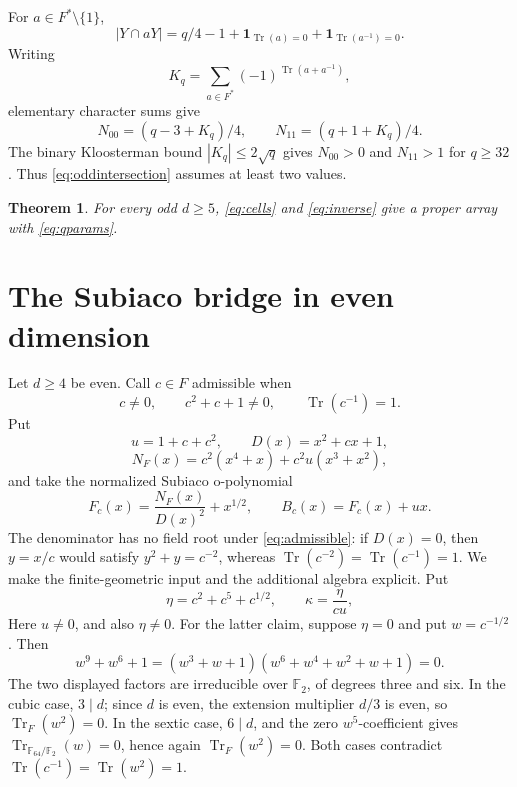\documentclass[11pt]{article}
\newtheorem{theorem}{Theorem}[section]
\theoremstyle{definition}\newtheorem{definition}[theorem]{Definition}
\theoremstyle{remark}\newtheorem{remark}[theorem]{Remark}
\DeclareMathOperator{\Tr}{Tr}
\newcommand{\ind}{\mathbf 1}
\begin{document}
For \(a\in F^*\setminus\{1\}\),
\begin{equation}
 |Y\cap aY|
 =q/4-1+\ind_{\Tr(a)=0}+\ind_{\Tr(a^{-1})=0}.
 \label{eq:oddintersection}
\end{equation}
Writing
\[
 K_q=\sum_{a\in F^*}(-1)^{\Tr(a+a^{-1})},
\]
elementary character sums give
\[
 N_{00}=(q-3+K_q)/4,\qquad N_{11}=(q+1+K_q)/4.
\]
The binary Kloosterman bound \(|K_q|\leq2\sqrt q\)
\cite{conrad-kloosterman} gives \(N_{00}>0\) and
\(N_{11}>1\) for \(q\geq32\).  Thus
\eqref{eq:oddintersection} assumes at least two values.

\begin{theorem}
\label{thm:odd}
For every odd \(d\geq5\), \eqref{eq:cells} and \eqref{eq:inverse} give a
proper array with \eqref{eq:qparams}.
\end{theorem}

\section{The Subiaco bridge in even dimension}
Let \(d\geq4\) be even.  Call \(c\in F\) admissible when
\begin{equation}
 c\neq0,\qquad c^2+c+1\neq0,\qquad \Tr(c^{-1})=1.
 \label{eq:admissible}
\end{equation}
Put
\[
 u=1+c+c^2,\qquad D(x)=x^2+cx+1,
\]
\[
 N_F(x)=c^2(x^4+x)+c^2u(x^3+x^2),
\]
and take the normalized Subiaco o-polynomial
\begin{equation}
 F_c(x)=\frac{N_F(x)}{D(x)^2}+x^{1/2},
 \qquad B_c(x)=F_c(x)+ux.
 \label{eq:subiaco}
\end{equation}
The denominator has no field root under \eqref{eq:admissible}: if \(D(x)=0\),
then \(y=x/c\) would satisfy \(y^2+y=c^{-2}\), whereas
\(\Tr(c^{-2})=\Tr(c^{-1})=1\).  We make the finite-geometric input and the
additional algebra explicit.  Put
\[
 \eta=c^2+c^5+c^{1/2},\qquad \kappa=\frac{\eta}{cu},
\]
Here \(u\ne0\), and also \(\eta\ne0\).  For the latter claim, suppose
\(\eta=0\) and put \(w=c^{-1/2}\).  Then
\[
 w^9+w^6+1=(w^3+w+1)(w^6+w^4+w^2+w+1)=0.
\]
The two displayed factors are irreducible over \(\mathbb F_2\), of degrees
three and six.  In the cubic case, \(3\mid d\); since \(d\) is even, the
extension multiplier \(d/3\) is even, so \(\Tr_F(w^2)=0\).  In the sextic
case, \(6\mid d\), and the zero \(w^5\)-coefficient gives
\(\Tr_{\mathbb F_{64}/\mathbb F_2}(w)=0\), hence again
\(\Tr_F(w^2)=0\).  Both cases contradict
\(\Tr(c^{-1})=\Tr(w^2)=1\).
\end{document}
